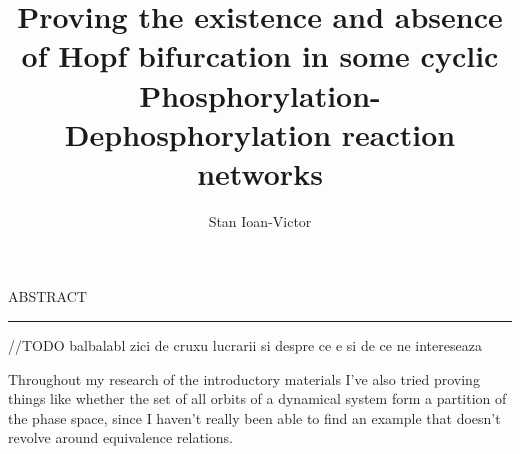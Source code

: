 \documentclass[12pt]{report}
\begin{document}
\theoremstyle{definition}
\newtheorem{theorem}{}
\newtheorem{corollary}[theorem]{Corollary}
\theoremstyle{definition}
\newtheorem{definition}{Definition}
\newtheorem{lemma}{Lemma}
\newtheorem{proposition}{Proposition}

\title{Proving the existence and absence of Hopf bifurcation in some cyclic Phosphorylation-Dephosphorylation reaction networks	}
\author{Stan Ioan-Victor}

\maketitle

\newpage
\thispagestyle{empty}
\mbox{}
\newpage
{}

\cleardoublepage
ABSTRACT
\vspace{0.5cm}
\hrule
\vspace{0.5cm}

\hfill\break
//TODO balbalabl zici de cruxu lucrarii si despre ce e si de ce ne intereseaza
\hfill\break

Throughout my research of the introductory materials I've also tried proving things like whether the set of all orbits of a dynamical system form a partition of the phase space, since I haven't really been able to find an example that doesn't revolve around equivalence relations.
\tableofcontents

\newpage
{}









\printbibliography
\end{document}
